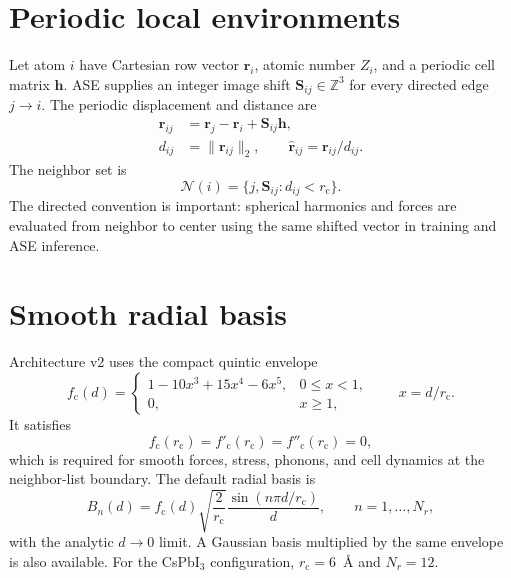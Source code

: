 \documentclass[10pt]{article}
\newcommand{\calN}{\mathcal{N}}
\newcommand{\vect}[1]{\bm{#1}}
\begin{document}
\section{Periodic local environments}

Let atom $i$ have Cartesian row vector $\vect r_i$, atomic number $Z_i$, and a
periodic cell matrix $\vect h$. ASE supplies an integer image shift
$\vect S_{ij}\in\mathbb{Z}^3$ for every directed edge $j\rightarrow i$. The
periodic displacement and distance are
\begin{align}
  \vect r_{ij} &= \vect r_j-\vect r_i+\vect S_{ij}\vect h, \\
  d_{ij} &= \lVert\vect r_{ij}\rVert_2, \qquad
  \widehat{\vect r}_{ij}=\vect r_{ij}/d_{ij}.
\end{align}
The neighbor set is
\begin{equation}
  \calN(i)=\{j,\vect S_{ij}:d_{ij}<r_{\mathrm c}\}.
\end{equation}
The directed convention is important: spherical harmonics and forces are
evaluated from neighbor to center using the same shifted vector in training and
ASE inference.

\section{Smooth radial basis}

Architecture v2 uses the compact quintic envelope
\begin{equation}
 f_{\mathrm c}(d)=
 \begin{cases}
  1-10x^3+15x^4-6x^5, & 0\leq x<1,\\
  0, & x\geq1,
 \end{cases}
 \qquad x=d/r_{\mathrm c}.
 \label{eq:cutoff}
\end{equation}
It satisfies
\begin{equation}
 f_{\mathrm c}(r_{\mathrm c})=f'_{\mathrm c}(r_{\mathrm c})
 =f''_{\mathrm c}(r_{\mathrm c})=0,
\end{equation}
which is required for smooth forces, stress, phonons, and cell dynamics at the
neighbor-list boundary. The default radial basis is
\begin{equation}
 B_n(d)=f_{\mathrm c}(d)\sqrt{\frac{2}{r_{\mathrm c}}}
 \frac{\sin(n\pi d/r_{\mathrm c})}{d},\qquad n=1,\ldots,N_r,
 \label{eq:bessel}
\end{equation}
with the analytic $d\rightarrow0$ limit. A Gaussian basis multiplied by the
same envelope is also available. For the CsPbI$_3$ configuration,
$r_{\mathrm c}=6$~\AA{} and $N_r=12$.
\end{document}
